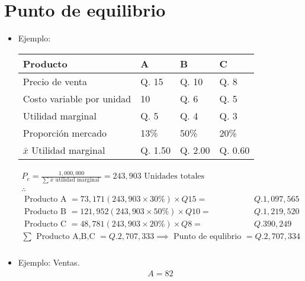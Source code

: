 \section{Punto de equilibrio}
\begin{itemize}
    \item Ejemplo: 
        \begin{center}
           \begin{tabular}{ | p{5cm} | p{5cm} | p{5cm} | p{5cm} | }
               \hline
                    Producto & A & B & C    \\ 
                \hline
                    Precio de venta & Q. 15 & Q. 10 & Q. 8 \\  
                    Costo variable por unidad & 10 & Q. 6 & Q. 5\\ 
                    Utilidad marginal & Q. 5 & Q. 4 & Q. 3 \\ 
               \hline
               Proporción mercado & 13\% & 50\% & 20\% \\ 
               $\bar{x}$ Utilidad marginal & Q. 1.50 & Q. 2.00 & Q. 0.60 \\ 
           \end{tabular}
            \begin{align*}
                P_e = \frac{1,000,000}{\sum_{}^{}\bar{x}\text{  utilidad marginal  }} = 243,903 \text{  Unidades totales  } \\ 
                \therefore \quad \\ 
                \text{  Producto A  } = 73,171 (243,903 \times 30\%) \times Q15 =& Q. 1,097,565 \\ 
                \text{  Producto B  } = 121,952 (243,903 \times 50\%) \times Q10 =& Q. 1,219,520 \\ 
                \text{  Producto C  } = 48,781 (243,903 \times 20\%) \times Q8 =& Q. 390,249 \\ 
                \sum_{}^{}\text{  Producto A,B,C  } = Q. 2,707,333 \implies \text{  Punto de equlibrio  } = Q. 2,707,334 \\ 
            \end{align*}
        \end{center}
    
    \item Ejemplo: Ventas.
        \begin{align*}
            A= 82
        \end{align*}
\end{itemize}
